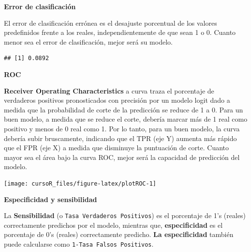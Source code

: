 \documentclass[]{book}
\newenvironment{Shaded}{\begin{snugshade}}{\end{snugshade}}
\newcommand{\KeywordTok}[1]{\textcolor[rgb]{0.13,0.29,0.53}{\textbf{#1}}}
\newcommand{\DataTypeTok}[1]{\textcolor[rgb]{0.13,0.29,0.53}{#1}}
\newcommand{\OperatorTok}[1]{\textcolor[rgb]{0.81,0.36,0.00}{\textbf{#1}}}
\newcommand{\NormalTok}[1]{#1}
\begin{document}
\textbf{Error de clasificación}

El error de clasificación errónea es el desajuste porcentual de los
valores predefinidos frente a los reales, independientemente de que sean
1 o 0. Cuanto menor sea el error de clasificación, mejor será su modelo.

\begin{Shaded}
\end{Shaded}

\begin{verbatim}
## [1] 0.0892
\end{verbatim}

\textbf{ROC}

\textbf{Receiver Operating Characteristics} a curva traza el porcentaje
de verdaderos positivos pronosticados con precisión por un modelo logit
dado a medida que la probabilidad de corte de la predicción se reduce de
1 a 0. Para un buen modelo, a medida que se reduce el corte, debería
marcar más de 1 real como positivo y menos de 0 real como 1. Por lo
tanto, para un buen modelo, la curva debería subir bruscamente,
indicando que el TPR (eje Y) aumenta más rápido que el FPR (eje X) a
medida que disminuye la puntuación de corte. Cuanto mayor sea el área
bajo la curva ROC, mejor será la capacidad de predicción del modelo.

\begin{Shaded}
\end{Shaded}

\begin{center}\texttt{[image: cursoR\_files/figure-latex/plotROC-1]} \end{center}

\textbf{Especificidad y sensibilidad}

La \textbf{Sensibilidad} (o \texttt{Tasa\ Verdaderos\ Positivos}) es el
porcentaje de 1's (reales) correctamente predichos por el modelo,
mientras que, \textbf{especificidad} es el porcentaje de 0's (reales)
correctamente predicho. \textbf{La especificidad} también puede
calcularse como \texttt{1-Tasa\ Falsos\ Positivos}.
\end{document}
